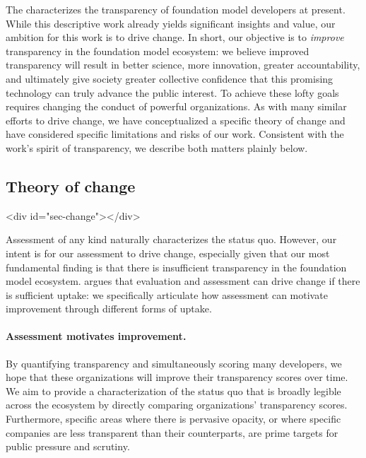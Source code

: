 \documentclass[screen, authorversion, acmsmall]{acmart}
\begin{document}
The \projectname characterizes the transparency of foundation model developers at present.
While this descriptive work already yields significant insights and value, our ambition for this work is to drive change. 
In short, our objective is to \textit{improve} transparency in the foundation model ecosystem: we believe improved transparency will result in better science, more innovation, greater accountability, and ultimately give society greater collective confidence that this promising technology can truly advance the public interest.
To achieve these lofty goals requires changing the conduct of powerful organizations.
As with many similar efforts to drive change, we have conceptualized a specific theory of change and have considered specific limitations and risks of our work.
Consistent with the work's spirit of transparency, we describe both matters plainly below. 

\hypertarget{change}{\subsection{Theory of change}}
<div id="sec-change"></div>

Assessment of any kind naturally characterizes the status quo.
However, our intent is for our assessment to drive change, especially given that our most fundamental finding is that there is insufficient transparency in the foundation model ecosystem.
\citet{bommasani2022evaluation} argues that evaluation and assessment can drive change if there is sufficient uptake: we specifically articulate how assessment can motivate improvement through different forms of uptake.

\paragraph{Assessment motivates improvement.}
By quantifying transparency and simultaneously scoring many developers, we hope that these organizations will improve their transparency scores over time.
We aim to provide a characterization of the status quo that is broadly legible across the ecosystem by directly comparing organizations' transparency scores. 
Furthermore, specific areas where there is pervasive opacity, or where specific companies are less transparent than their counterparts, are prime targets for public pressure and scrutiny. 
\end{document}

